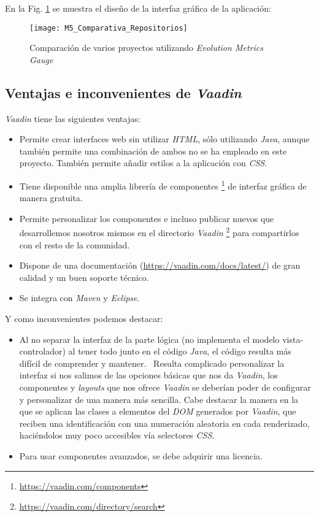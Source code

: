 En la Fig. \ref{fig:M5_Comparativa_Repositorios} se muestra el diseño de la interfaz gráfica de la aplicación:

\begin{figure}[!h]
	\centering
	\texttt{[image: M5\_Comparativa\_Repositorios]}
	\caption{Comparación de varios proyectos utilizando \textit{Evolution Metrics Gauge}}\label{fig:M5_Comparativa_Repositorios}
\end{figure}
\FloatBarrier

\newpage
\subsection{Ventajas e inconvenientes de \textit{Vaadin}}
\textit{Vaadin} tiene las siguientes ventajas:
\begin{itemize}
	\item Permite crear interfaces web sin utilizar \textit{HTML}, sólo utilizando \textit{Java}, aunque también permite una combinación de ambos no se ha empleado en este proyecto. También permite añadir estilos a la aplicación con \textit{CSS}.
	\item Tiene disponible una amplia librería de componentes \footnote{\url{https://vaadin.com/components}} de interfaz gráfica de manera gratuita.
	\item Permite personalizar los componentes e incluso publicar nuevos que desarrollemos nosotros mismos en el directorio \textit{Vaadin} \footnote{\url{https://vaadin.com/directory/search}} para compartirlos con el resto de la comunidad.
	\item Dispone de una documentación (\url{https://vaadin.com/docs/latest/}) de gran calidad y un buen soporte técnico.
	\item Se integra con \textit{Maven} y \textit{Eclipse}.
\end{itemize}

Y como inconvenientes podemos destacar:
\begin{itemize}
	\item Al no separar la interfaz de la parte lógica (no implementa el modelo vista-controlador) al tener todo junto en el código \textit{Java}, el código resulta más difícil de comprender y mantener.
	\ Resulta complicado personalizar la interfaz si nos salimos de las opciones básicas que nos da \textit{Vaadin}, los componentes y \textit{layouts} que nos ofrece \textit{Vaadin} se deberían poder de configurar y personalizar de una manera más sencilla. Cabe destacar la manera en la que se aplican las clases a elementos del \textit{DOM} generados por \textit{Vaadin}, que reciben una identificación con una numeración aleatoria en cada renderizado, haciéndolos muy poco accesibles vía selectores \textit{CSS}.
	\item Para usar componentes avanzados, se debe adquirir una licencia.
\end{itemize}


